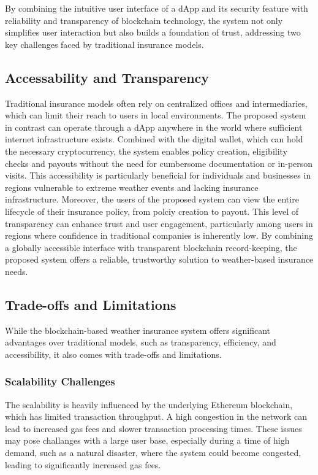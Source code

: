 By combining the intuitive user interface of a dApp and its security feature with reliability and transparency of blockchain technology, the system not only simplifies user interaction but also builds a foundation of trust, addressing two key challenges faced by traditional insurance models. 

\subsection{Accessability and Transparency}\label{accessibility_transparency}
Traditional insurance models often rely on centralized offices and intermediaries, which can limit their reach to users in local environments. The proposed system in contrast can operate through a dApp anywhere in the world where sufficient internet infrastructure exists. Combined with the digital wallet, which can hold the necessary cryptocurrency, the system enables policy creation, eligibility checks and payouts without the need for cumbersome documentation or in-person visits. This accessibility is particularly beneficial for individuals and businesses in regions vulnerable to extreme weather events and lacking insurance infrastructure. Moreover, the users of the proposed system can view the entire lifecycle of their insurance policy, from polciy creation to payout. This level of transparency can enhance trust and user engagement, particularly among users in regions where confidence in traditional companies is inherently low. By combining a globally accessible interface with transparent blockchain record-keeping, the proposed system offers a reliable, trustworthy solution to weather-based insurance needs.

\subsection{Trade-offs and Limitations}
While the blockchain-based weather insurance system offers significant advantages over traditional models, such as transparency, efficiency, and accessibility, it also comes with trade-offs and limitations.

\subsubsection{Scalability Challenges}
The scalability is heavily influenced by the underlying Ethereum blockchain, which has limited transaction throughput. A high congestion in the network can lead to increased gas fees and slower transaction processing times. These issues may pose challanges with a large user base, especially during a time of high demand, such as a natural disaster, where the system could become congested, leading to significantly increased gas fees.

